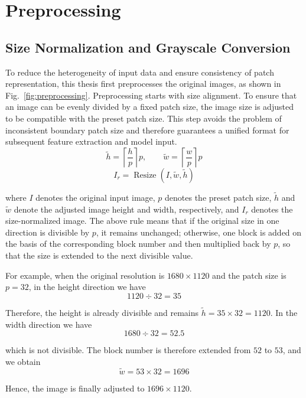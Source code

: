 \section{Preprocessing}
\subsection{Size Normalization and Grayscale Conversion}
\par To reduce the heterogeneity of input data and ensure consistency of patch
representation, this thesis first preprocesses the original images, as shown
in Fig.~\ref{fig:preprocessing}. Preprocessing starts with size alignment. To
ensure that an image can be evenly divided by a fixed patch size, the image
size is adjusted to be compatible with the preset patch size. This step avoids
the problem of inconsistent boundary patch size and therefore guarantees a
unified format for subsequent feature extraction and model input.
\begin{equation}
    \tilde{h}=\left\lceil \frac{h}{p} \right\rceil p,\qquad
    \tilde{w}=\left\lceil \frac{w}{p} \right\rceil p
    \label{eq:resize-shape}
\end{equation}
\begin{equation}
    I_r=\operatorname{Resize}(I,\tilde{w},\tilde{h})
    \label{eq:resize-op}
\end{equation}
\par where $I$ denotes the original input image, $p$ denotes the preset patch
size, $\tilde{h}$ and $\tilde{w}$ denote the adjusted image height and width,
respectively, and $I_r$ denotes the size-normalized image. The above rule
means that if the original size in one direction is divisible by $p$, it
remains unchanged; otherwise, one block is added on the basis of the
corresponding block number and then multiplied back by $p$, so that the size
is extended to the next divisible value.

\par For example, when the original resolution is $1680\times1120$ and the
patch size is $p=32$, in the height direction we have
\begin{equation}
    1120 \div 32 = 35
\end{equation}
\par Therefore, the height is already divisible and remains
$\tilde{h}=35\times32=1120$. In the width direction we have
\begin{equation}
    1680 \div 32 = 52.5
\end{equation}
\par which is not divisible. The block number is therefore extended from $52$
to $53$, and we obtain
\begin{equation}
    \tilde{w}=53\times32=1696
\end{equation}
\par Hence, the image is finally adjusted to $1696\times1120$.

